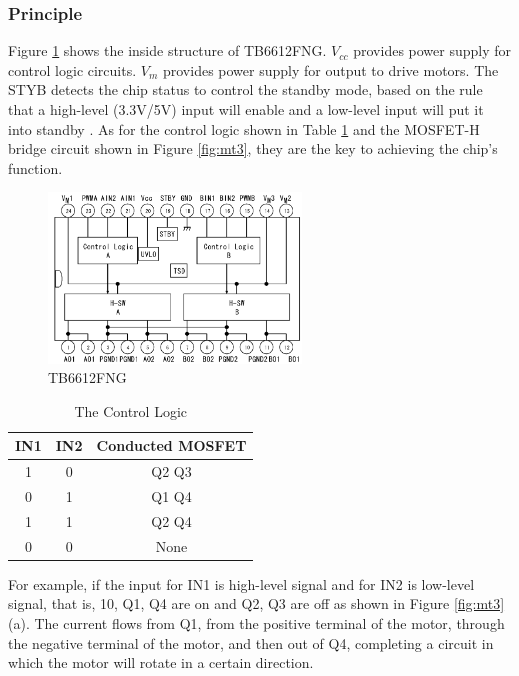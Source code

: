 \documentclass[12pt, a4paper, oneside]{report}
\begin{document}
\subsubsection{Principle}
Figure \ref{fig:mt2} shows the inside structure of TB6612FNG. $V_{cc}$ provides power supply for control logic circuits. $V_m$ provides power supply for output to drive motors. The STYB detects the chip status to control the standby mode, based on the rule that a high-level (3.3V/5V) input will enable and a low-level input will put it into standby \cite{zzs1}. As for the control logic shown in Table \ref{tab:mt1} and the MOSFET-H bridge circuit shown in Figure \ref{fig:mt3}, they are the key to achieving the chip's function.

\begin{figure}[H]
  \centering
  \includegraphics[width=0.6\textwidth]{pic/Motor Drive/2.png}
  \caption{TB6612FNG \cite{zzs1}}
  \label{fig:mt2}
\end{figure}

\begin{table}[H]
    \centering
    \begin{tabular}{|c|c|c|}
    \hline
        IN1 & IN2 & Conducted MOSFET \\ \hline
        1 & 0 & Q2 Q3 \\ \hline
        0 & 1 & Q1 Q4 \\ \hline
        1 & 1 & Q2 Q4 \\ \hline
        0 & 0 & None \\ \hline
    \end{tabular}
    \caption{The Control Logic} 
    \label{tab:mt1}
\end{table}

For example, if the input for IN1 is high-level signal and for IN2 is low-level signal, that is, 10, Q1, Q4 are on and Q2, Q3 are off as shown in Figure \ref{fig:mt3}(a). The current flows from Q1, from the positive terminal of the motor, through the negative terminal of the motor, and then out of Q4, completing a circuit in which the motor will rotate in a certain direction.
\end{document}

